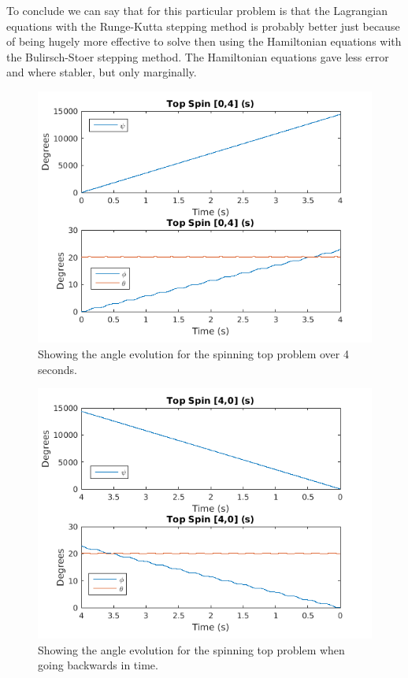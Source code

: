 \documentclass[11pt]{article}
\begin{document}
To conclude we can say that for this particular problem is that the Lagrangian equations with the Runge-Kutta stepping method is probably better just because of being hugely more effective to solve then using the Hamiltonian equations with the Bulirsch-Stoer stepping method. The Hamiltonian equations gave less error and where stabler, but only marginally. 
\begin{figure}[H]
	\centering
	\includegraphics[width=1\textwidth]{../ex3/plots/forwardData.png}
	\caption{Showing the angle evolution for the spinning top problem over 4 seconds.}
	\label{fig:forwardDataHAM}
\end{figure}

\begin{figure}[H]
	\centering
	\includegraphics[width=1\textwidth]{../ex3/plots/backwardData.png}
	\caption{Showing the angle evolution for the spinning top problem when going backwards in time.}
	\label{fig:backwardDataHAM}
\end{figure}
\end{document}
